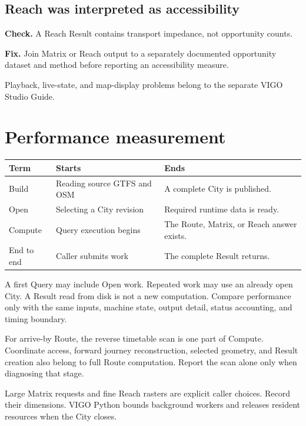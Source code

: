 \documentclass[10pt,letterpaper]{article}
\begin{document}
\subsection{Reach was interpreted as accessibility}

\textbf{Check.} A Reach Result contains transport impedance, not opportunity counts.

\textbf{Fix.} Join Matrix or Reach output to a separately documented opportunity dataset and method before reporting an accessibility measure.

Playback, live-state, and map-display problems belong to the separate VIGO Studio Guide.

\appendix

\section{Performance measurement}

\begin{center}
\begin{tabularx}{\linewidth}{P{1.05in} Y Y}
\toprule
\textbf{Term} & \textbf{Starts} & \textbf{Ends} \\
\midrule
Build & Reading source GTFS and OSM & A complete City is published. \\
Open & Selecting a City revision & Required runtime data is ready. \\
Compute & Query execution begins & The Route, Matrix, or Reach answer exists. \\
End to end & Caller submits work & The complete Result returns. \\
\bottomrule
\end{tabularx}
\end{center}

A first Query may include Open work. Repeated work may use an already open City. A Result read from disk is not a new computation. Compare performance only with the same inputs, machine state, output detail, status accounting, and timing boundary.

For arrive-by Route, the reverse timetable scan is one part of Compute. Coordinate access, forward journey reconstruction, selected geometry, and Result creation also belong to full Route computation. Report the scan alone only when diagnosing that stage.

Large Matrix requests and fine Reach rasters are explicit caller choices. Record their dimensions. VIGO Python bounds background workers and releases resident resources when the City closes.
\end{document}
